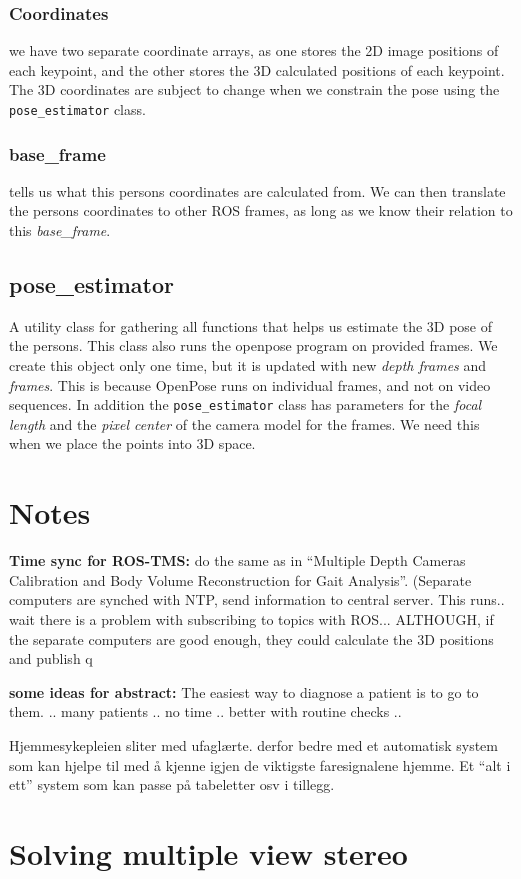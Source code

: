 \documentclass[a4paper]{article}
\begin{document}
\subsubsection{Coordinates} we have two separate coordinate arrays, as one stores the 2D image positions of each keypoint, and the other stores the 3D calculated positions of each keypoint. The 3D coordinates are subject to change when we constrain the pose using the \texttt{pose\_estimator} class.
\subsubsection{base\_frame} tells us what this persons coordinates are calculated from. We can then translate the persons coordinates to other ROS frames, as long as we know their relation to this \emph{base\_frame}.

\subsection{pose\_estimator}
A utility class for gathering all functions that helps us estimate the 3D pose of the persons. This class also runs the openpose program on provided frames. We create this object only one time, but it is updated with new \emph{depth frames} and \emph{frames}. This is because OpenPose runs on individual frames, and not on video sequences.
In addition the \texttt{pose\_estimator} class has parameters for the \emph{focal length} and the \emph{pixel center} of the camera model for the frames. We need this when we place the points into 3D space. 

\section{Notes}

\textbf{Time sync for ROS-TMS:} do the same as in ``Multiple Depth Cameras Calibration and Body Volume Reconstruction for Gait Analysis''. (Separate computers are synched with NTP, send information to central server. This runs.. wait there is a problem with subscribing to topics with ROS... ALTHOUGH, if the separate computers are good enough, they could calculate the 3D positions and publish q

\textbf{some ideas for abstract:} The easiest way to diagnose a patient is to go to them. .. many patients .. no time .. better with routine checks .. 

Hjemmesykepleien sliter med ufaglærte. derfor bedre med et automatisk system som kan hjelpe til med å kjenne igjen de viktigste faresignalene hjemme. Et ``alt i ett'' system som kan passe på tabeletter osv i tillegg. 
\listoffigures
\listoftables

\section{Solving multiple view stereo}
\end{document}
